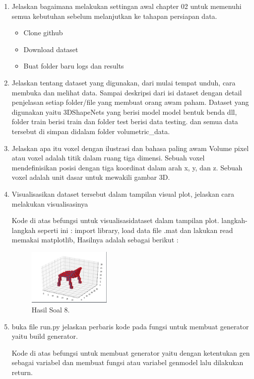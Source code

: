 \begin{enumerate}
	\item Jelaskan bagaimana melakukan settingan awal chapter 02 untuk memenuhi semua kebutuhan sebelum melanjutkan ke tahapan persiapan data.
    \hfill\break
    \begin{itemize}
		\item Clone github
		\item Download dataset
		\item Buat folder baru logs dan results
	\end{itemize}

	\item Jelaskan tentang dataset yang digunakan, dari mulai tempat unduh, cara membuka dan melihat data. Sampai deskripsi dari isi dataset dengan detail penjelasan setiap folder/ﬁle yang membuat orang awam paham.
    \hfill\break
    Dataset yang digunakan yaitu 3DShapeNets yang berisi model model bentuk benda dll, folder train berisi train dan folder test berisi data testing. dan semua data tersebut di simpan didalam folder volumetric\_data.
	
	\item Jelaskan apa itu voxel dengan ilustrasi dan bahasa paling awam
    \hfill\break
    Volume pixel atau voxel adalah titik dalam ruang tiga dimensi. Sebuah voxel mendeﬁnisikan posisi dengan tiga koordinat dalam arah x, y, dan z. Sebuah voxel adalah unit dasar untuk mewakili gambar 3D.

	\item Visualisasikan dataset tersebut dalam tampilan visual plot, jelaskan cara melakukan visualisasinya
    \hfill\break
    
    Kode di atas befungsi untuk visualisasidataset dalam tampilan plot. langkah-langkah seperti ini :
    import library, load data file .mat dan lakukan read memakai matplotlib, Hasilnya adalah sebagai berikut :
	\begin{figure}[H]
	\centering
		\includegraphics[width=4cm]{figures/1174096/tugas8/p8.PNG}
		\caption{Hasil Soal 8.}
	\end{figure}

	\item buka ﬁle run.py jelaskan perbaris kode pada fungsi untuk membuat generator yaitu build generator.
	\hfill\break
	
	Kode di atas befungsi untuk membuat generator yaitu dengan ketentukan gen sebagai variabel dan membuat fungsi atau variabel genmodel lalu dilakukan return. 


\end{enumerate}

